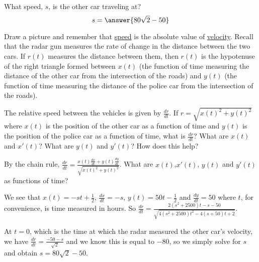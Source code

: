 \documentclass{ximera}
\begin{document}
\begin{exercise}
What speed, $s$, is the other car traveling at?
\[
s=\answer{80\sqrt{2}-50}
\]
\begin{hint}
Draw a picture and remember that \underline{speed} is the absolute value of \underline{velocity}. Recall that the radar gun measures the rate of change in the distance between the two cars. If $r(t)$ measures the distance between them, then $r(t)$ is the hypotenuse of the right triangle formed between $x(t)$ (the function of time measuring the distance of the other car from the intersection of the roads) and $y(t)$ (the function of time measuring the distance of the police car from the intersection of the roads). 
\end{hint}
\begin{hint}
The relative speed between the vehicles is given by $\frac{dr}{dt}$. If $r=\sqrt{x(t)^2+y(t)^2}$ where $x(t)$ is the position of the other car as a function of time and $y(t)$ is the position of the police car as a function of time, what is $\frac{dr}{dt}$? What are $x(t)$ and $x'(t)$? What are $y(t)$ and $y'(t)$? How does this help? 
\end{hint}
\begin{hint}
By the chain rule, $\frac{dr}{dt}=\frac{x(t)\frac{dx}{dt}+y(t)\frac{dy}{dt}}{\sqrt{x(t)^2+y(t)^2}}$. What are $x(t)$,$x'(t)$, $y(t)$ and $y'(t)$ as functions of time?
\end{hint}
\begin{hint}
We see that $x(t)=-st+\frac{1}{2}$, $\frac{dx}{dt}=-s$, $y(t)=50t-\frac{1}{2}$ and $\frac{dy}{dt}=50$ where $t$, for convenience, is time measured in hours. So $\frac{dr}{dt}=\frac{2(s^2+2500) t-s-50}{\sqrt{4(s^2+2500) t^2-4 (s+50) t+2}}$.
\end{hint}
\begin{hint}
At $t=0$, which is the time at which the radar measured the other car's velocity, we have $\frac{dr}{dt}=\frac{-50-s}{\sqrt{2}}$ and we know this is equal to $-80$, so we simply solve for $s$ and obtain $s=80\sqrt{2}-50$.\\


\end{hint}
\end{exercise}
\end{document}

